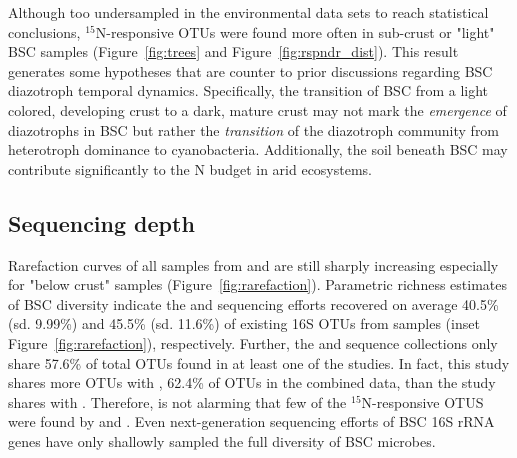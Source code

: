 Although too undersampled in the environmental data sets to reach statistical
conclusions, $^{15}$N-responsive OTUs were found more often in sub-crust or
"light" BSC samples (Figure~\ref{fig:trees} and Figure~\ref{fig:rspndr_dist}).
This result generates some hypotheses that are counter to prior discussions
regarding BSC diazotroph temporal dynamics. Specifically, the transition of BSC
from a light colored, developing crust to a dark, mature crust may not mark the
\textit{emergence} of diazotrophs in BSC but rather the \textit{transition} of
the diazotroph community from heterotroph dominance to cyanobacteria.
Additionally, the soil beneath BSC may contribute significantly to the N budget
in arid ecosystems.

\subsection{Sequencing depth}
Rarefaction curves of all samples from \citet{Steven_2013} and
\citet{Garcia_Pichel_2013} are still sharply increasing especially for "below
crust" samples (Figure~\ref{fig:rarefaction}). Parametric richness estimates of
BSC diversity indicate the \citet{Steven_2013} and \citet{Garcia_Pichel_2013}
sequencing efforts recovered on average 40.5\% (sd. 9.99\%) and 45.5\% (sd.
11.6\%) of existing 16S OTUs from samples (inset Figure~\ref{fig:rarefaction}),
respectively. Further, the \citet{Steven_2013} and \citet{Garcia_Pichel_2013}
sequence collections only share 57.6\% of total OTUs found in at least one of
the studies. In fact, this study shares more OTUs with \citet{Steven_2013},
62.4\% of OTUs in the combined data, than the \citet{Steven_2013} study shares
with \citet{Garcia_Pichel_2013}.  Therefore, is not alarming that few of the
$^{15}$N-responsive OTUS were found by \citet{Garcia_Pichel_2013} and
\citet{Steven_2013}. Even next-generation sequencing efforts of BSC 16S rRNA
genes have only shallowly sampled the full diversity of BSC microbes.  
